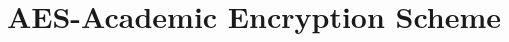 \documentclass[10pt,letterpaper,twocolumn]{article}
\title{AES-Academic Encryption Scheme}
\author{}
\begin{document}
\maketitle















\begin{appendix}

\end{appendix}
\end{document}

